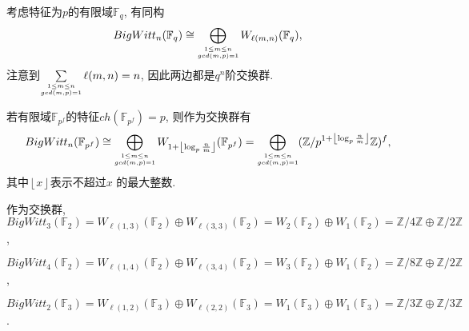 {\color{blue}考虑特征为$p$的有限域$\mathbb{F}_q$, 有同构\cite{Lauter1999A}
\[BigWitt_n(\mathbb{F}_{q}) \cong \bigoplus_{\scriptsize\substack{1\leq m\leq n \\ gcd(m, p)=1}} W_{\ell(m, n)}(\mathbb{F}_{q}), \]}
注意到$\sum\limits_{\scriptsize\substack{1\leq m\leq n \\ gcd(m, p)=1}} \ell(m, n) = n$, 因此两边都是$q^n$阶交换群. 
\begin{corollary}
\label{cor:BW}
	若有限域$\mathbb{F}_{p^f}$的特征$ch(\mathbb{F}_{p^f})=p$, 则作为交换群有
	\[
	BigWitt_n(\mathbb{F}_{p^f})\cong \bigoplus_{\scriptsize\substack{1\leq m\leq n \\ gcd(m, p)=1}}W_{1+ \left \lfloor\log_p \frac{n}{m}  \right \rfloor}(\mathbb{F}_{p^f}) = \bigoplus_{\scriptsize\substack{1\leq m\leq n \\ gcd(m, p)=1}}(\mathbb{Z}/p^{1+ \left \lfloor\log_p \frac{n}{m}  \right \rfloor}\mathbb{Z})^f, 
	\]
	其中$ \left \lfloor x \right \rfloor$表示不超过$x$
	的最大整数. 
\end{corollary}
\begin{example}
	作为交换群, $BigWitt_3(\mathbb{F}_2)= W_{\ell(1, 3)}(\mathbb{F}_2)\oplus W_{\ell(3, 3)}(\mathbb{F}_2)=W_2(\mathbb{F}_2)\oplus W_1(\mathbb{F}_2)=\mathbb{Z}/4 \mathbb{Z}\oplus	\mathbb{Z}/2 \mathbb{Z}$, 

	$BigWitt_4(\mathbb{F}_2)= W_{\ell(1, 4)}(\mathbb{F}_2)\oplus W_{\ell(3, 4)}(\mathbb{F}_2)=W_3(\mathbb{F}_2)\oplus W_1(\mathbb{F}_2)=\mathbb{Z}/8 \mathbb{Z}\oplus	\mathbb{Z}/2 \mathbb{Z}$, 

	$BigWitt_2(\mathbb{F}_3)= W_{\ell(1, 2)}(\mathbb{F}_3)\oplus W_{\ell(2, 2)}(\mathbb{F}_3)=W_1(\mathbb{F}_3)\oplus W_1(\mathbb{F}_3)=\mathbb{Z}/3 \mathbb{Z}\oplus	\mathbb{Z}/3 \mathbb{Z}$. 

\end{example}